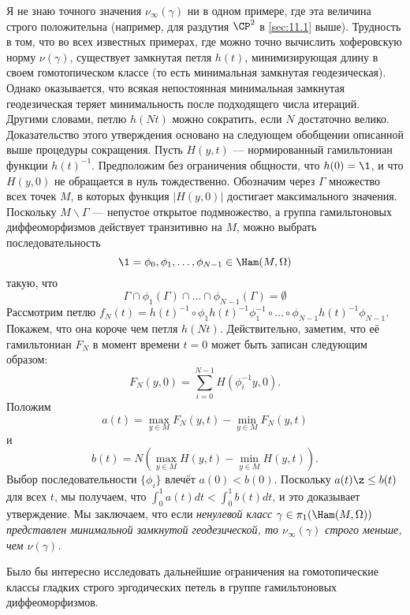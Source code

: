 Я не знаю точного значения $\nu_\infty (\gamma)$ ни в одном примере, где эта величина строго положительна (например, для раздутия $\CP^2$ в \ref{sec:11.1} выше).
Трудность в том, что во всех известных примерах, где можно точно вычислить хоферовскую норму $\nu(\gamma)$, существует замкнутая петля $h(t)$, минимизирующая длину в своем гомотопическом классе (то есть минимальная замкнутая геодезическая).
Однако оказывается, что всякая непостоянная минимальная замкнутая геодезическая теряет минимальность после подходящего числа итераций.
Другими словами, петлю $h(Nt)$ можно сократить, если $N$ достаточно велико.
Доказательство этого утверждения основано на следующем обобщении описанной выше процедуры сокращения.
Пусть $H(y, t)$ --- нормированный гамильтониан функции $h(t)^{-1}$.
Предположим без ограничения общности, что $h(0) = \1$, и что $H(y,0)$ не обращается в нуль тождественно.
Обозначим через $\Gamma$ множество всех точек $M$, в которых функция $|H(y, 0)|$ достигает максимального значения.
Поскольку $M \backslash \Gamma$ --- непустое открытое подмножество, а группа гамильтоновых диффеоморфизмов действует транзитивно на $M$, можно выбрать последовательность 
\[\1=\phi_0,\phi_1,\dots,\phi_{N-1}\in\Ham(M,\Omega)\]
такую, что 
\[\Gamma\cap\phi_1(\Gamma)\cap\dots\cap\phi_{N-1}(\Gamma)=\emptyset\]
Рассмотрим петлю $f_N(t) = h(t)^{-1} \circ \phi_1h(t)^{-1}\phi_1^{-1} \circ \dots \circ \phi_{N-1}h(t)^{-1}\phi_{N-1}$.
Покажем, что она короче чем петля $h(Nt)$.
Действительно, заметим, что её гамильтониан $F_N$ в момент времени $t = 0$ может быть записан следующим образом:
\[F_N(y,0) = \sum_{i=0}^{N-1} H(\phi_i^{-1}y, 0).\]
Положим
\[a(t)
=
\max_{y\in M} F_N(y, t) - \min_{y\in M}  F_N(y, t)
\]
и
\[b(t)
=
N(\max_{y\in M} H(y, t) - \min_{y\in M}  H(y, t)).
\]
Выбор последовательности $\{\phi_i\}$ влечёт $a(0) < b(0)$.
Поскольку $a(t) \z\le b(t)$ для всех $t$, мы получаем, что $\int_0^1a(t)dt < \int_0^1 b(t)dt$, и это доказывает утверждение.
Мы заключаем, что если \textit{ненулевой класс $\gamma\in \pi_1(\Ham(M, \Omega))$ представлен минимальной замкнутой геодезической, то $\nu_\infty (\gamma)$ строго меньше, чем $\nu(\gamma)$.}

Было бы интересно исследовать дальнейшие ограничения на гомотопические классы гладких строго эргодических петель в группе гамильтоновых диффеоморфизмов.
